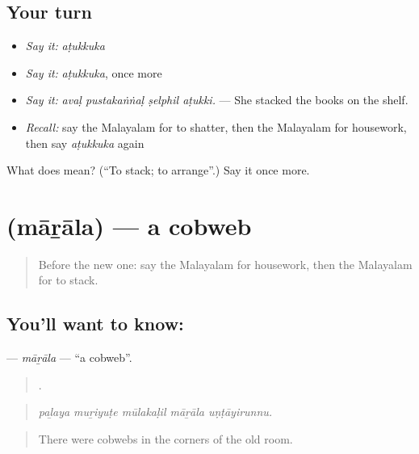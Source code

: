 \subsection*{Your turn}
\begin{itemize}
\raggedright
  \item \emph{Say it:} \emph{aṭukkuka}
  \item \emph{Say it:} \emph{aṭukkuka}, once more
  \item \emph{Say it:} \emph{avaḷ pustakaṅṅaḷ ṣelphil aṭukki.} — She stacked the books on the shelf.
  \item \emph{Recall:} say the Malayalam for to shatter, then the Malayalam for housework, then say \emph{aṭukkuka} again
\end{itemize}

\begin{tcolorbox}[breakable,colback=teal!4,colframe=teal!35!black,title={Before you move on}]
What does  mean? (\textquotedblleft{}To stack; to arrange\textquotedblright{}.) Say it once more.
\end{tcolorbox}
\section[\texorpdfstring{\ml{മാറാല} (māṟāla)}{മാറാല (māṟāla)}]{ (māṟāla) — a cobweb}

\label{lesson:ML-C572-marala}



\begin{quote}
Before the new one: say the Malayalam for housework, then the Malayalam for to stack.
\end{quote}

\subsection*{You'll want to know: }
\textbf{} — \emph{māṟāla} — \textquotedblleft{}a cobweb\textquotedblright{}.

\begin{quote}
    .
\end{quote}

\begin{quote}
\emph{paḻaya muṟiyuṭe mūlakaḷil māṟāla uṇṭāyirunnu.}
\end{quote}

\begin{quote}
There were cobwebs in the corners of the old room.
\end{quote}


